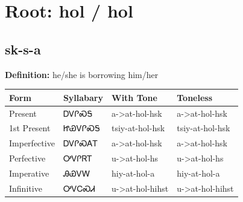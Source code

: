 \documentclass{article}%
\begin{document}
%
\normalsize%
\section*{Root: hol / hol}%
\subsection*{sk-s-a}%
\textbf{Definition: }%
he/she is borrowing him/her%
\\[0.5em]%
\begin{tabular}{|l|l|l|l|}%
\hline%
\textbf{Form}&\textbf{Syllabary}&\textbf{With Tone}&\textbf{Toneless}\\%
\hline%
Present&ᎠᏙᎵᏍᎦ&a{-}>at{-}hol{-}hsk&a{-}>at{-}hol{-}hsk\\%
1st Present&ᏥᏯᏙᎵᏍᎦ&tsiy{-}at{-}hol{-}hsk&tsiy{-}at{-}hol{-}hsk\\%
Imperfective&ᎠᏙᎵᏍᎪᎢ&a{-}>at{-}hol{-}hsk&a{-}>at{-}hol{-}hsk\\%
Perfective&ᎤᏙᎵᏒᎢ&u{-}>at{-}hol{-}hs&u{-}>at{-}hol{-}hs\\%
Imperative&ᎯᏯᏙᎳ&hiy{-}at{-}hol{-}a&hiy{-}at{-}hol{-}a\\%
Infinitive&ᎤᏙᏟᏍᏗ&u{-}>at{-}hol{-}hihst&u{-}>at{-}hol{-}hihst\\%
\hline%
\end{tabular}%
\\[1em]%
\end{document}

